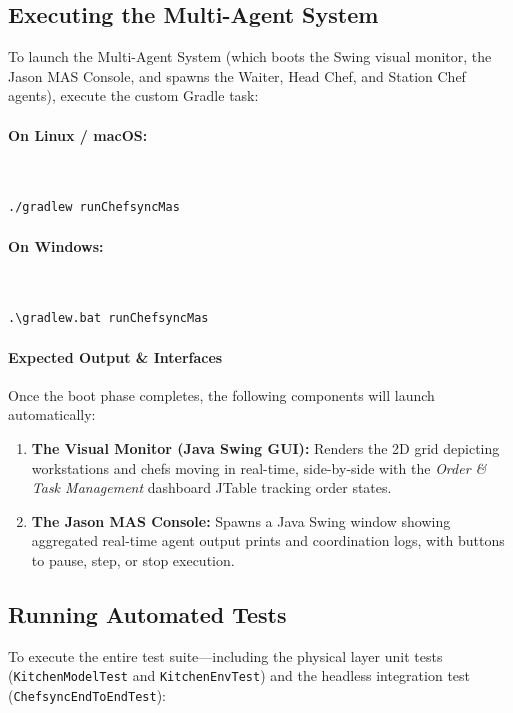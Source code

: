 \documentclass{scrartcl}
\begin{document}
\subsection{Executing the Multi-Agent System}
To launch the Multi-Agent System (which boots the Swing visual monitor, the Jason MAS Console, and spawns the Waiter, Head Chef, and Station Chef agents), execute the custom Gradle task:

\paragraph{On Linux / macOS:}~\\
\begin{lstlisting}[basicstyle=\footnotesize\ttfamily, breaklines=true]
./gradlew runChefsyncMas
\end{lstlisting}

\paragraph{On Windows:}~\\
\begin{lstlisting}[basicstyle=\footnotesize\ttfamily, breaklines=true]
.\gradlew.bat runChefsyncMas
\end{lstlisting}

\paragraph{Expected Output \& Interfaces}
Once the boot phase completes, the following components will launch automatically:
\begin{enumerate}
\item \textbf{The Visual Monitor (Java Swing GUI):} Renders the 2D grid depicting workstations and chefs moving in real-time, side-by-side with the \textit{Order \& Task Management} dashboard JTable tracking order states.
\item \textbf{The Jason MAS Console:} Spawns a Java Swing window showing aggregated real-time agent output prints and coordination logs, with buttons to pause, step, or stop execution.
\end{enumerate}


\subsection{Running Automated Tests}

To execute the entire test suite—including the physical layer unit tests (\texttt{KitchenModelTest} and \texttt{KitchenEnvTest}) and the headless integration test (\texttt{ChefsyncEndToEndTest}):
\end{document}
